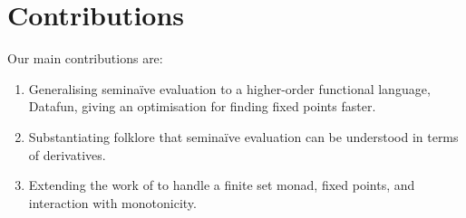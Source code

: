 \documentclass[sigplan,screen,review,timestamp,dvipsnames]{acmart}
\newcommand{\naive}{na\"ive}
\begin{document}

\section{Contributions}

Our main contributions are:
%
\begin{enumerate}
\item Generalising semi\naive{} evaluation to a higher-order functional
  language, Datafun, giving an optimisation for finding fixed points faster.

\item Substantiating folklore that semi\naive{} evaluation can be understood in
  terms of derivatives.

\item Extending the work of \citet{incremental} to handle a finite set monad,
  fixed points, and interaction with monotonicity.
\end{enumerate}




\end{document}
